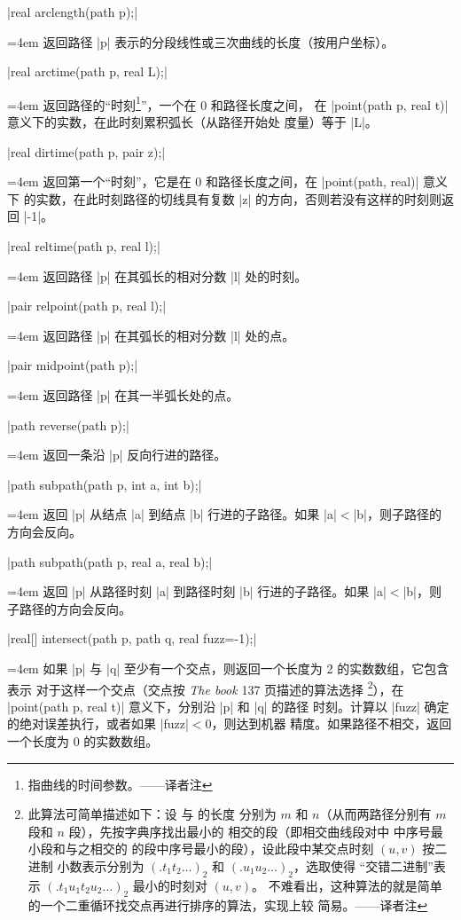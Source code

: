 \documentclass{ctexbook}
\makeatletter
\newenvironment{funclist}{\trivlist
  \parindent=0pt
\item[]
  \def\item{\medskip\par\leftskip=0pt}
  \def\go{\par\leftskip=4em}}
{\endtrivlist}
\newenvironment{typelist}{\itemize
  \let\old@item\@item
  \def\@item[##1]{\expandafter\old@item[\ttfamily\color{type!50!black}##1]}}
{\enditemize}
\newcommand\transnote[1]{\footnote{#1——译者注}}
\makeatother
\begin{document}
\begin{typelist}
\begin{funclist}
\item |real arclength(path p);| \go
  返回路径 |p| 表示的分段线性或三次曲线的长度（按用户坐标）。

\item |real arctime(path p, real L);| \go
  返回路径的“时刻\transnote{指曲线的时间参数。}”，一个在 0 和路径长度之间，
  在 |point(path p, real t)| 意义下的实数，在此时刻累积弧长（从路径开始处
  度量）等于 |L|。

\item |real dirtime(path p, pair z);| \go
  返回第一个“时刻”，它是在 0 和路径长度之间，在 |point(path, real)| 意义下
  的实数，在此时刻路径的切线具有复数 |z| 的方向，否则若没有这样的时刻则返回
  |-1|。

\item |real reltime(path p, real l);| \go
  返回路径 |p| 在其弧长的相对分数 |l| 处的时刻。

\item |pair relpoint(path p, real l);| \go
  返回路径 |p| 在其弧长的相对分数 |l| 处的点。

\item |pair midpoint(path p);| \go
  返回路径 |p| 在其一半弧长处的点。

\item |path reverse(path p);| \go
  返回一条沿 |p| 反向行进的路径。

\item |path subpath(path p, int a, int b);| \go
  返回 |p| 从结点 |a| 到结点 |b| 行进的子路径。如果 |a|${}<{}$|b|，则子路径的
  方向会反向。

\item |path subpath(path p, real a, real b);| \go
  返回 |p| 从路径时刻 |a| 到路径时刻 |b| 行进的子路径。如果 |a|${}<{}$|b|，则
  子路径的方向会反向。

\item |real[] intersect(path p, path q, real fuzz=-1);| \go
  如果 |p| 与 |q| 至少有一个交点，则返回一个长度为 2 的实数数组，它包含表示
  对于这样一个交点（交点按 \textit{The \MF{}book} 137 页描述的算法选择%
  \transnote{此算法可简单描述如下：设  与  的长度
  分别为 $m$ 和 $n$（从而两路径分别有 $m$ 段和 $n$ 段），先按字典序找出最小的
  相交的段（即相交曲线段对中 \inlinecode{p} 中序号最小段和与之相交的
  \inlinecode{q} 的段中序号最小的段），设此段中某交点时刻 $(u, v)$ 按二进制
  小数表示分别为 $(.t_1 t_2 \ldots)_2$ 和 $(.u_1 u_2 \ldots)_2$，选取使得
  “交错二进制”表示 $(.t_1 u_1 t_2 u_2 \ldots)_2$ 最小的时刻对 $(u, v)$。
  不难看出，这种算法的就是简单的一个二重循环找交点再进行排序的算法，实现上较
  简易。}），在 |point(path p, real t)| 意义下，分别沿 |p| 和 |q| 的路径
  时刻。计算以 |fuzz| 确定的绝对误差执行，或者如果 |fuzz|${}<0$，则达到机器
  精度。如果路径不相交，返回一个长度为 0 的实数数组。


\end{funclist}
\end{typelist}
\end{document}
